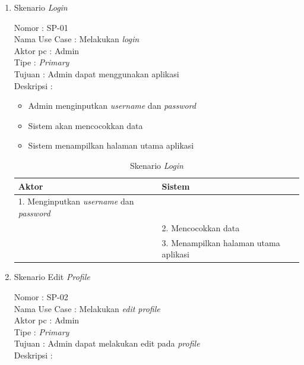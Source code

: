 \begin{enumerate}
	\item Skenario \textit{Login}
	
	Nomor \kern 3.6pc : SP-01 \\
	Nama Use Case : Melakukan \textit{login} \\
	Aktor  pc : Admin \\
	Tipe \kern 4.6pc : \textit{Primary} \\
	Tujuan \kern 3.6pc : Admin dapat menggunakan aplikasi \\
	Deskripsi \kern 2.5pc : 
	
	\begin{itemize}
		\item Admin menginputkan \textit{username} dan \textit{password}
		\item Sistem akan mencocokkan data
		\item Sistem menampilkan halaman utama aplikasi
	\end{itemize}

	\begin{table}
		\caption{Skenario \textit{Login}}
		\centering
		\begin{tabular}{ | p{60mm} | p{68mm} |}
			\hline 
			\textbf{Aktor} & \textbf{Sistem} \\
			\hline
			
			1.	Menginputkan \textit{username} dan \textit{password} &  \\
			
			\hline
			
			& 2. Mencocokkan data \\
			
			\hline
			
			& 3.	Menampilkan halaman utama aplikasi \\
		
			\hline
			
		\end{tabular}
	\end{table}

\item Skenario Edit \textit{Profile}

Nomor \kern 3.6pc : SP-02 \\
Nama Use Case : Melakukan \textit{edit profile} \\
Aktor  pc : Admin \\
Tipe \kern 4.6pc : \textit{Primary} \\
Tujuan \kern 3.6pc : Admin dapat melakukan edit pada \textit{profile} \\
Deskripsi \kern 2.5pc : 


\end{enumerate}
